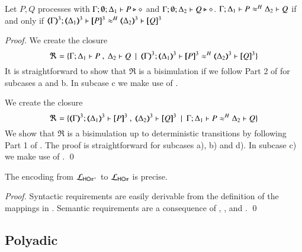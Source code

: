 \begin{proposition}\rm
	\label{prop:fulla_HOpp_to_HOp}
	Let $P, Q$ \HOpp processes with $\Gamma; \emptyset; \Delta_1 \vdash P \triangleright \diamond$ and 
	$\Gamma; \emptyset; \Delta_2 \vdash Q \triangleright \diamond$.
	$\Gamma; \Delta_1 \vdash P \approx^{H} \Delta_2 \vdash Q$ if and only if $\horel{\tmap{\Gamma}{3}}{\tmap{\Delta_1}{3}}{\pmap{P}{3}}{\wb}{\tmap{\Delta_2}{3}}{\pmap{Q}{3}}$
\end{proposition}

\begin{proof}

	\noi We create the closure
%
	\[
		\Re = \set{\horel{\Gamma}{\Delta_1}{P}{\ ,\ }{\Delta_2}{Q} \setbar \horel{\tmap{\Gamma}{3}}{\tmap{\Delta_1}{3}}{\pmap{P}{3}}{\wb}{\tmap{\Delta_2}{3}}{\pmap{Q}{3}}}
	\]
%
	\noi	It is straightforward to show that $\Re$ is a bisimulation if we follow Part 2 of
		 for subcases a and b.
		In subcase c we make use of .


	\noi We create the closure
%
	\[
		\Re = \set{\horel{\tmap{\Gamma}{3}}{\tmap{\Delta_1}{3}}{\pmap{P}{3}}{\ ,\ }{\tmap{\Delta_2}{3}}{\pmap{Q}{3}} \setbar \horel{\Gamma}{\Delta_1}{P}{\wb}{\Delta_2}{Q}}
	\]
%
	\noi	We show that $\Re$ is a bisimulation up to deterministic transitions
		by following Part 1 of .
		The proof is straightforward for subcases a), b) and d).
		In subcase c) we make use of .
	\qed
\end{proof}

\begin{proposition}\rm
	\label{prop:prec:HOpp_to_HOp}
	The encoding from $\mathcal{L}_{\mathsf{HO}\pi^{\mathsf +}}$ to $\mathcal{L}_{\mathsf{HO}\pi}$
	is precise.
\end{proposition}

\begin{proof}
	Syntactic requirements are easily derivable from the
	definition of the mappings in .
	Semantic requirements are a consequence of
	, , and .
	\qed
\end{proof}



\subsection{Polyadic \HOp}
\label{subsec:pol_HOp}



